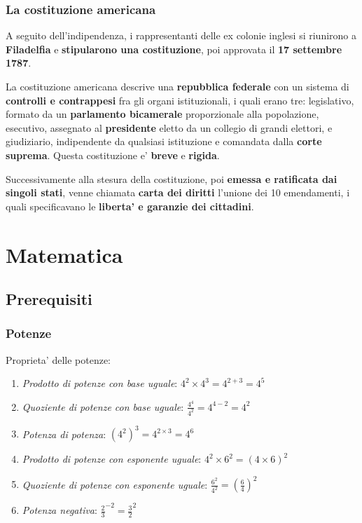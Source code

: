 \documentclass{article}
\begin{document}
{{    \subsubsection{La costituzione americana} %
    A seguito dell'indipendenza, i rappresentanti delle ex colonie inglesi si riunirono a \textbf{Filadelfia} e \textbf{stipularono una costituzione}, poi approvata il \textbf{17 settembre 1787}.

    La costituzione americana descrive una \textbf{repubblica federale} con un sistema di \textbf{controlli e contrappesi} fra gli organi istituzionali, i quali erano tre: legislativo, formato da un \textbf{parlamento bicamerale} proporzionale alla popolazione, esecutivo, assegnato al \textbf{presidente} eletto da un collegio di grandi elettori, e giudiziario, indipendente da qualsiasi istituzione e comandata dalla \textbf{corte suprema}. Questa costituzione e' \textbf{breve} e \textbf{rigida}.

    Successivamente alla stesura della costituzione, poi \textbf{emessa e ratificata dai singoli stati}, venne chiamata \textbf{carta dei diritti} l'unione dei 10 emendamenti, i quali specificavano le \textbf{liberta' e garanzie dei cittadini}.
  }

  \pagebreak
  \section{Matematica}
  {
    \subsection{Prerequisiti}
    \subsubsection{Potenze} %
    Proprieta' delle potenze:
    \begin{enumerate}
      \item \textit{Prodotto di potenze con base uguale}: $ 4^2 \times 4^3 = 4^{2 + 3} = 4^5 $
      \item \textit{Quoziente di potenze con base uguale}: $ \frac{4^4}{4^2} = 4^{4 - 2} = 4^2 $
      \item \textit{Potenza di potenza}: $ (4^2)^3 = 4^{2 \times 3} = 4^6 $
      \item \textit{Prodotto di potenze con esponente uguale}: $ 4^2 \times 6^2 = (4 \times 6)^2 $
      \item \textit{Quoziente di potenze con esponente uguale}: $ \frac{6^2}{4^2} = (\frac{6}{4})^2 $
      \item \textit{Potenza negativa}: $ \frac{2}{3}^{-2} = \frac{3}{2}^2 $
    \end{enumerate}

}}
\end{document}
